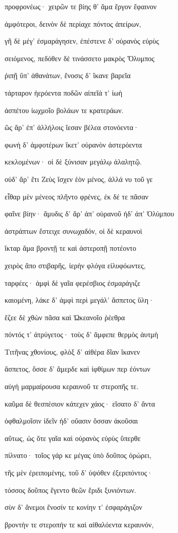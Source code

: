 \begin{pages}
\begin{Leftside}
προφρονέως· χειρῶν τε βίης θ' ἅμα ἔργον ἔφαινον 

ἀμφότεροι, δεινὸν δὲ περίαχε πόντος ἀπείρων,

γῆ δὲ μέγ' ἐσμαράγησεν, ἐπέστενε δ' οὐρανὸς εὐρὺς

σειόμενος, πεδόθεν δὲ τινάσσετο μακρὸς Ὄλυμπος 

ῥιπῇ ὕπ' ἀθανάτων, ἔνοσις δ' ἵκανε βαρεῖα

τάρταρον ἠερόεντα ποδῶν αἰπεῖά τ' ἰωὴ

ἀσπέτου ἰωχμοῖο βολάων τε κρατεράων. 

ὣς ἄρ' ἐπ' ἀλλήλοις ἵεσαν βέλεα στονόεντα· 

φωνὴ δ' ἀμφοτέρων ἵκετ' οὐρανὸν ἀστερόεντα 

κεκλομένων· οἱ δὲ ξύνισαν μεγάλῳ ἀλαλητῷ. 

οὐδ' ἄρ' ἔτι Ζεὺς ἴσχεν ἑὸν μένος, ἀλλά νυ τοῦ γε

εἶθαρ μὲν μένεος πλῆντο φρένες, ἐκ δέ τε πᾶσαν

φαῖνε βίην· ἄμυδις δ' ἄρ' ἀπ' οὐρανοῦ ἠδ' ἀπ' Ὀλύμπου 

ἀστράπτων ἔστειχε συνωχαδόν, οἱ δὲ κεραυνοὶ  

ἴκταρ ἅμα βροντῇ τε καὶ ἀστεροπῇ ποτέοντο

χειρὸς ἄπο στιβαρῆς, ἱερὴν φλόγα εἰλυφόωντες, 

ταρφέες· ἀμφὶ δὲ γαῖα φερέσβιος ἐσμαράγιζε 

καιομένη, λάκε δ' ἀμφὶ περὶ μεγάλ' ἄσπετος ὕλη·

ἔζεε δὲ χθὼν πᾶσα καὶ Ὠκεανοῖο ῥέεθρα 

πόντός τ' ἀτρύγετος· τοὺς δ' ἄμφεπε θερμὸς ἀυτμὴ 

Τιτῆνας χθονίους, φλὸξ δ' αἰθέρα δῖαν ἵκανεν

ἄσπετος, ὄσσε δ' ἄμερδε καὶ ἰφθίμων περ ἐόντων

αὐγὴ μαρμαίρουσα κεραυνοῦ τε στεροπῆς τε.

καῦμα δὲ θεσπέσιον κάτεχεν χάος· εἴσατο δ' ἄντα  

ὀφθαλμοῖσιν ἰδεῖν ἠδ' οὔασιν ὄσσαν ἀκοῦσαι

αὔτως, ὡς ὅτε γαῖα καὶ οὐρανὸς εὐρὺς ὕπερθε 

πίλνατο· τοῖος γάρ κε μέγας ὑπὸ δοῦπος ὀρώρει, 

τῆς μὲν ἐρειπομένης, τοῦ δ' ὑψόθεν ἐξεριπόντος· 

τόσσος δοῦπος ἔγεντο θεῶν ἔριδι ξυνιόντων. 

σὺν δ' ἄνεμοι ἔνοσίν τε κονίην τ' ἐσφαράγιζον

βροντήν τε στεροπήν τε καὶ αἰθαλόεντα κεραυνόν,


\end{Leftside}
\end{pages}
